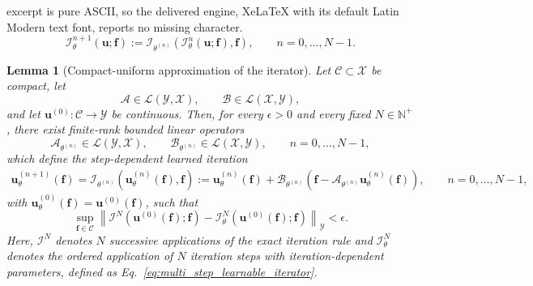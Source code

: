 \documentclass[10pt,a4paper]{amsart}
\newtheorem{lemma}{Lemma}
\begin{document}
excerpt is pure ASCII, so the delivered engine, XeLaTeX with its default Latin Modern text font, reports no missing character.
		\begin{equation}
			\label{eq:multi_step_learnable_iterator}
			\mathcal I_\theta^{n+1}(\boldsymbol u;\boldsymbol f)
			:=
			\mathcal I_{\theta^{(n)}}\left(
			\mathcal I_\theta^n(\boldsymbol u;\boldsymbol f),
			\boldsymbol f
			\right),
			\qquad
			n=0,\ldots,N-1.
		\end{equation}

			\begin{lemma}[Compact-uniform approximation of the iterator]
				\label{lem:univ_iter}
				Let $\mathcal C\subset\mathcal X$ be compact,
				let
				\[
				\mathcal A\in\mathcal L(\mathcal Y,\mathcal X),
				\qquad
				\mathcal B\in\mathcal L(\mathcal X,\mathcal Y),
				\]
				and let
				$\boldsymbol u^{(0)}:\mathcal C\to\mathcal Y$
				be continuous. 
				Then, for every $\epsilon>0$ and every fixed
				$N\in\mathbb N^+$, there exist finite-rank bounded linear operators
				\[
				\mathcal A_{\theta^{(n)}}
				\in\mathcal L(\mathcal Y,\mathcal X),
				\qquad
				\mathcal B_{\theta^{(n)}}
				\in\mathcal L(\mathcal X,\mathcal Y),
				\qquad
				n=0,\ldots,N-1,
				\]
				which define the step-dependent learned iteration
				\[
				\begin{aligned}
					\boldsymbol u_\theta^{(n+1)}(\boldsymbol f)
					=
					\mathcal I_{\theta^{(n)}}\left(
					\boldsymbol u_\theta^{(n)}(\boldsymbol f),
					\boldsymbol f
					\right)
					:=
					\boldsymbol u_\theta^{(n)}(\boldsymbol f)
					+
					\mathcal B_{\theta^{(n)}}
					\left(
					\boldsymbol f
					-
					\mathcal A_{\theta^{(n)}}
					\boldsymbol u_\theta^{(n)}(\boldsymbol f)
					\right),
					\qquad
					n=0,\ldots,N-1,
				\end{aligned}
				\]
				with $\boldsymbol u_\theta^{(0)}(\boldsymbol f)
				= \boldsymbol u^{(0)}(\boldsymbol f)$, 
				such that
				\[
				\sup_{\boldsymbol f\in\mathcal C}
				\left\|
				\mathcal I^N\left(
				\boldsymbol u^{(0)}(\boldsymbol f);
				\boldsymbol f
				\right)
				-
				\mathcal I_\theta^N\left(
				\boldsymbol u^{(0)}(\boldsymbol f);
				\boldsymbol f
				\right)
				\right\|_{\mathcal Y}
				<\epsilon.
				\]
				Here, $\mathcal I^N$ denotes $N$ successive applications of the exact
				iteration rule and $\mathcal I_\theta^N$ denotes the ordered application of $N$
				iteration steps with iteration-dependent parameters, defined as Eq.~\eqref{eq:multi_step_learnable_iterator}.
			\end{lemma}
\end{document}
